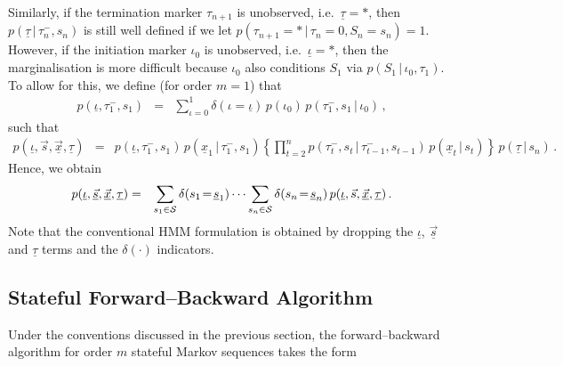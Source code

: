 \documentclass[a4paper]{article}
\newcommand{\ui}{\underline{\iota}}
\newcommand{\ut}{\underline{\tau}}
\newcommand{\tm}{\tau^{-}}
\newcommand{\vs}{\vec{s}}
\newcommand{\uvs}{\underline{\vs}}
\newcommand{\vx}{\vec{x}}
\newcommand{\uvx}{\underline{\vx}}
\newcommand{\ux}{\underline{x}}
\newcommand{\us}{\underline{s}}
\begin{document}
Similarly, if the termination marker $\tau_{n+1}$ is unobserved, i.e.\ $\ut=*$, then 
 $p(\ut\,|\,\tm_n,s_n)$ is still well defined if we let
$p(\tau_{n+1}=*\,|\,\tau_n\!=\!0,S_n\!=\!s_n)=1$.
However, if the initiation marker $\iota_0$ is unobserved, i.e.\ $\ui=*$, then the marginalisation is more difficult
because $\iota_0$ also conditions $S_1$ via $p(S_1\,|\,\iota_0,\tau_1)$. To allow for this, we define (for order $m=1$) that
\begin{eqnarray}
 p(\ui,\tm_1,s_1) & = & \sum_{\iota=0}^{1}\delta(\iota\!=\!\ui) \,p(\iota_0)\,p(\tm_1,s_1\,|\,\iota_0)\,,
\end{eqnarray}
such that
\begin{eqnarray}
p(\ui,\vs,\uvx,\ut) & = & 
p(\ui,\tm_1,s_1)
\,p(\ux_1\,|\,\tm_1,s_1)
\left\{\prod_{t=2}^{n}p(\tm_t,s_t\,|\,\tm_{t-1},s_{t-1})
\,p(\ux_t\,|\,s_t)\right\}
\,p(\ut\,|\,s_n)
\,.
\label{eq:stateful-1-model:hidden-markers}
\end{eqnarray}
Hence, we obtain
\begin{eqnarray}
p(\ui,\uvs,\uvx,\ut) & = & 
\sum_{s_1\in{\cal S}} \delta(s_1\!=\!\us_1)
\cdots\sum_{s_n\in{\cal S}} \delta(s_n\!=\!\us_n)
\,p(\ui,\vs,\uvx,\ut)\,.
\end{eqnarray}
Note that the conventional HMM formulation is obtained by dropping the $\ui$, $\uvs$ and $\ut$ terms and the $\delta(\cdot)$ indicators.

\subsection{Stateful Forward--Backward Algorithm}\label{sec:forward-backward:stateful}

Under the conventions discussed in the previous section, the forward--backward algorithm for order $m$ stateful Markov sequences takes the form
\end{document}
